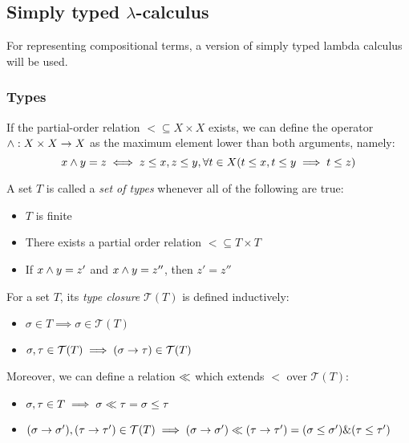\documentclass[main.tex]{subfiles}
\begin{document}
\subsection{Simply typed $\lambda$-calculus}
\label{sec:lambda}

For representing compositional terms, a version of simply typed lambda calculus
will be used.

\subsubsection{Types}
\begin{defn}
    If the partial-order relation $\less \subseteq X \times X$ exists,
    we can define the operator $\wedge : X \times X \rightarrow X$ as the
    maximum element lower than both arguments, namely:
    \[ x \wedge y = z \iff z \leq x, z \leq y,
        \forall t \in X (t \leq x, t \leq y \implies t \leq z) \]
\end{defn}

\begin{defn}
    A set $T$ is called a \emph{set of types} whenever all of the following
    are true:
    \begin{itemize}
        \item $T$ is finite
        \item There exists a partial order relation $\less \subseteq T \times T$
        \item If $x \wedge y = z'$ and $x \wedge y = z''$, then $z' = z''$
    \end{itemize}
\end{defn}

\begin{defn}
    For a set $T$, its \emph{type closure} $\mathcal{T}(T)$ is defined
    inductively:

    \begin{itemize}
        \item $\sigma \in T \implies \sigma \in \mathcal{T}(T)$
        \item $\sigma, \tau \in \mathcal{T}(T) \implies (\sigma \rightarrow \tau) \in \mathcal{T}(T)$
    \end{itemize}

    Moreover, we can define a relation $\ll$ which extends $\less$ over
    $\mathcal{T}(T)$:
    \begin{itemize}
        \item $\sigma, \tau \in T \implies \sigma \ll \tau = \sigma \leq \tau$
        \item $(\sigma \rightarrow \sigma'), (\tau \rightarrow \tau') \in \mathcal{T}(T) \implies
            (\sigma \rightarrow \sigma') \ll (\tau \rightarrow \tau') = (\sigma \leq \sigma')
            \& (\tau \leq \tau')$
    \end{itemize}
\end{defn}
\end{document}
